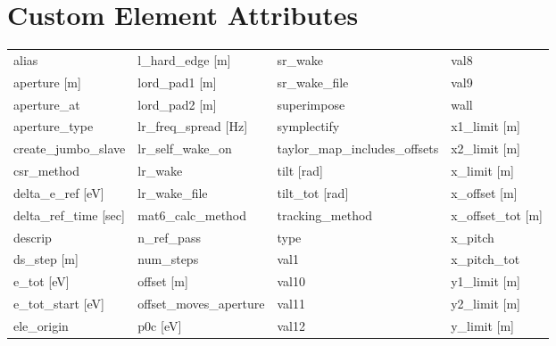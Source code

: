  \section{Custom Element Attributes}
 \label{s:list.custom}

 \begin{tabular}{llll} \toprule
alias                          & l_hard_edge [m]                & sr_wake                        & val8                           \\
aperture [m]                   & lord_pad1 [m]                  & sr_wake_file                   & val9                           \\
aperture_at                    & lord_pad2 [m]                  & superimpose                    & wall                           \\
aperture_type                  & lr_freq_spread [Hz]            & symplectify                    & x1_limit [m]                   \\
create_jumbo_slave             & lr_self_wake_on                & taylor_map_includes_offsets    & x2_limit [m]                   \\
csr_method                     & lr_wake                        & tilt [rad]                     & x_limit [m]                    \\
delta_e_ref [eV]               & lr_wake_file                   & tilt_tot [rad]                 & x_offset [m]                   \\
delta_ref_time [sec]           & mat6_calc_method               & tracking_method                & x_offset_tot [m]               \\
descrip                        & n_ref_pass                     & type                           & x_pitch                        \\
ds_step [m]                    & num_steps                      & val1                           & x_pitch_tot                    \\
e_tot [eV]                     & offset [m]                     & val10                          & y1_limit [m]                   \\
e_tot_start [eV]               & offset_moves_aperture          & val11                          & y2_limit [m]                   \\
ele_origin                     & p0c [eV]                       & val12                          & y_limit [m]                    \\

\end{tabular}
